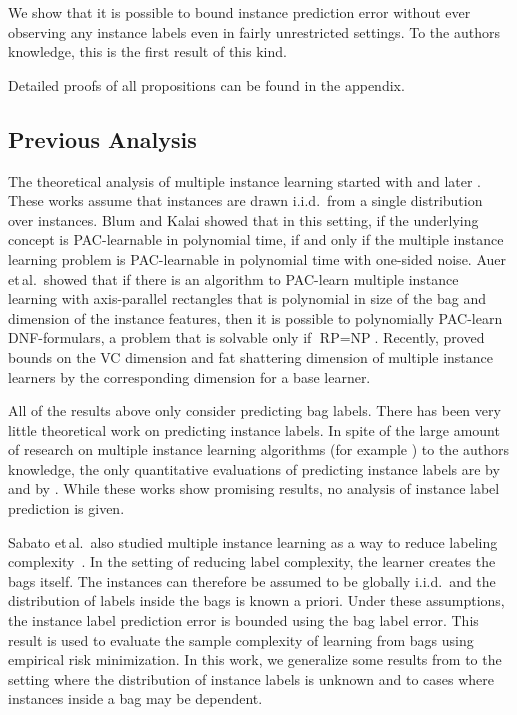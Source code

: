We show that it is possible to bound instance prediction error without
ever observing any instance labels even in fairly unrestricted settings.
To the authors knowledge, this is the first result of this kind.

Detailed proofs of all propositions can be found in the appendix.

\subsection{Previous Analysis}
The theoretical analysis of multiple instance learning started with \citet{auer1997approximating} and later \citet{blum1998note}.
These works assume that instances are drawn i.i.d.\ from a single distribution over instances. Blum and Kalai showed that in this
setting, if the underlying concept is PAC-learnable in polynomial time, if and only if the multiple instance learning problem is PAC-learnable
in polynomial time with one-sided noise. Auer et\,al.\ showed that if there is an algorithm to PAC-learn multiple instance learning with axis-parallel
rectangles that is polynomial in size of the bag and dimension of the instance features, then it is possible to polynomially
PAC-learn DNF-formulars, a problem that is solvable only if $\text{RP}=\text{NP}$.
Recently, \citet{sabato2009homogeneous,DBLP:journals/corr/abs-1107-2021} proved bounds on the VC dimension and
fat shattering dimension of multiple instance learners by the corresponding dimension for a base learner.

All of the results above only consider predicting bag labels. There has been very little theoretical work
on predicting instance labels. In spite of the large amount of research on multiple instance learning algorithms 
(for example \citet{andrews2003support,gaertner2002multi,zhou2009multi,li2009convex,zhang2002dd,mangasarian2008multiple,leistner2010miforests,chen2006miles})
to the authors knowledge, the only quantitative evaluations of predicting
instance labels are by \citet{gehler2007deterministic} and by \citet{liconvex2010}. While these works show promising results,
no analysis of instance label prediction is given.

Sabato et\,al.\ also studied multiple instance learning as a way
to reduce labeling complexity~\citep{sabato2010reducing}.
In the setting of reducing label complexity, the learner creates
the bags itself. The instances can therefore be assumed to be globally i.i.d.\ and
the distribution of labels inside the bags is known a priori.
Under these assumptions, the instance label prediction error is bounded using the bag label error.
This result is used to evaluate the sample complexity of learning from bags using empirical risk minimization.
In this work, we generalize some results from \citet{sabato2010reducing} to the setting where the distribution
of instance labels is unknown and to cases where instances inside a bag may be dependent.


